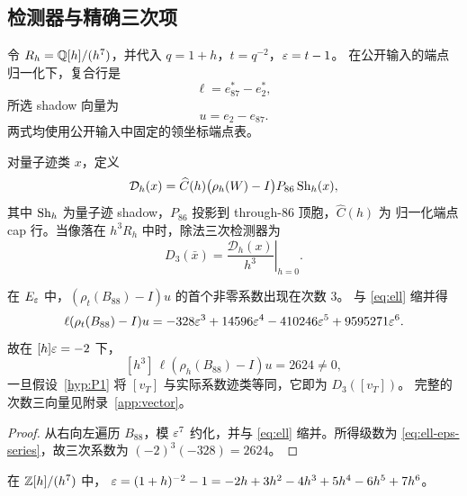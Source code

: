 \subsection{检测器与精确三次项}

令 $R_h=\mathbb{Q}[h]/(h^7)$，并代入 $q=1+h$，$t=q^{-2}$，$\varepsilon=t-1$。
在公开输入的端点归一化下，复合行是
\begin{equation}\label{eq:ell}
\ell=e_{87}^{*}-e_2^{*},
\end{equation}
所选 shadow 向量为
\begin{equation}\label{eq:u}
u=e_2-e_{87}.
\end{equation}
两式均使用公开输入中固定的领坐标端点表。

\begin{definition}[除法三次检测器]\label{def:detector}
对量子迹类 $x$，定义
\[
\mathcal D_h(x)=
\widehat C(h)\bigl(\rho_h(W)-I\bigr)P_{86}\operatorname{Sh}_h(x),
\]
其中 $\operatorname{Sh}_h$ 为量子迹 shadow，$P_{86}$ 投影到 through-$86$ 顶胞，$\widehat C(h)$ 为
归一化端点 cap 行。当像落在 $h^3R_h$ 中时，除法三次检测器为
\begin{equation}\label{eq:D3}
D_3(\bar x)=\left.\frac{\mathcal D_h(x)}{h^3}\right|_{h=0}.
\end{equation}
\end{definition}

\begin{proposition}[所选值]\label{prop:D3-vT}
在 $E_\varepsilon$ 中，$(\rho_t(B_{88})-I)u$ 的首个非零系数出现在次数 $3$。
与 \eqref{eq:ell} 缩并得
\begin{equation}\label{eq:ell-eps-series}
\ell(\rho_t(B_{88})-I)u
=-328\varepsilon^3+14596\varepsilon^4-410246\varepsilon^5+9595271\varepsilon^6.
\end{equation}
故在 $[h]\varepsilon=-2$ 下，
\begin{equation}\label{eq:D3-vT-value}
[h^3]\,\ell(\rho_h(B_{88})-I)u=2624\ne0,
\end{equation}
一旦假设~\ref{hyp:P1} 将 $[v_T]$ 与实际系数迹类等同，它即为 $D_3([v_T])$。
完整的次数三向量见附录~\ref{app:vector}。
\end{proposition}

\begin{proof}
从右向左遍历 $B_{88}$，模 $\varepsilon^7$ 约化，并与 \eqref{eq:ell} 缩并。所得级数为
\eqref{eq:ell-eps-series}，故三次系数为 $(-2)^3(-328)=2624$。
\end{proof}

\begin{lemma}[参数展开]\label{lem:eps-of-h}
在 $\mathbb{Z}[h]/(h^7)$ 中，
$\varepsilon=(1+h)^{-2}-1=-2h+3h^2-4h^3+5h^4-6h^5+7h^6$。
\end{lemma}

